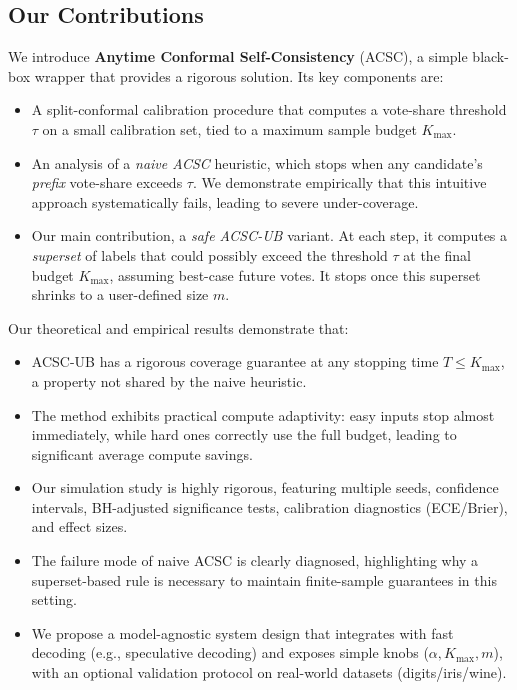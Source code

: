 \documentclass[11pt]{article}
\begin{document}
\subsection{Our Contributions}
\label{sec:contribs}
We introduce \textbf{Anytime Conformal Self-Consistency} (ACSC), a simple black-box wrapper that provides a rigorous solution. Its key components are:
\begin{itemize}
\item A split-conformal calibration procedure that computes a vote-share threshold $\tau$ on a small calibration set, tied to a maximum sample budget $K_{\max}$.
\item An analysis of a \emph{naive ACSC} heuristic, which stops when any candidate's \emph{prefix} vote-share exceeds $\tau$. We demonstrate empirically that this intuitive approach systematically fails, leading to severe under-coverage.
\item Our main contribution, a \emph{safe ACSC-UB} variant. At each step, it computes a \emph{superset} of labels that could possibly exceed the threshold $\tau$ at the final budget $K_{\max}$, assuming best-case future votes. It stops once this superset shrinks to a user-defined size $m$.
\end{itemize}
Our theoretical and empirical results demonstrate that:
\begin{itemize}
\item ACSC-UB has a rigorous coverage guarantee at any stopping time $T \le K_{\max}$, a property not shared by the naive heuristic.
\item The method exhibits practical compute adaptivity: easy inputs stop almost immediately, while hard ones correctly use the full budget, leading to significant average compute savings.
\item Our simulation study is highly rigorous, featuring multiple seeds, confidence intervals, BH-adjusted significance tests, calibration diagnostics (ECE/Brier), and effect sizes.
\item The failure mode of naive ACSC is clearly diagnosed, highlighting why a superset-based rule is necessary to maintain finite-sample guarantees in this setting.
\item We propose a model-agnostic system design that integrates with fast decoding (e.g., speculative decoding) and exposes simple knobs ($\alpha, K_{\max}, m$), with an optional validation protocol on real-world datasets (digits/iris/wine).
\end{itemize}
\end{document}
